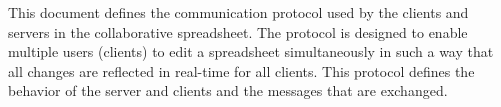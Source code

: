 This document defines the communication protocol used by the clients and servers in the collaborative spreadsheet. The protocol is designed to enable multiple users (clients) to edit a spreadsheet simultaneously in such a way that all changes are reflected in real-time for all clients. This protocol defines the behavior of the server and clients and the messages that are exchanged.